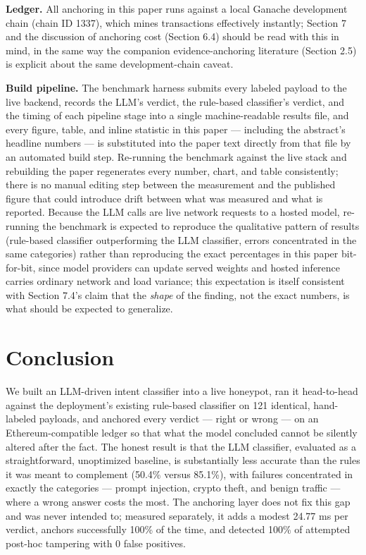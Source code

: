 \documentclass[journal,10pt,twocolumn]{IEEEtran}
\begin{document}
\textbf{Ledger.} All anchoring in this paper runs against a local Ganache development chain (chain ID 1337), which mines transactions effectively instantly; Section 7 and the discussion of anchoring cost (Section 6.4) should be read with this in mind, in the same way the companion evidence-anchoring literature (Section 2.5) is explicit about the same development-chain caveat.

\textbf{Build pipeline.} The benchmark harness submits every labeled payload to the live backend, records the LLM's verdict, the rule-based classifier's verdict, and the timing of each pipeline stage into a single machine-readable results file, and every figure, table, and inline statistic in this paper --- including the abstract's headline numbers --- is substituted into the paper text directly from that file by an automated build step. Re-running the benchmark against the live stack and rebuilding the paper regenerates every number, chart, and table consistently; there is no manual editing step between the measurement and the published figure that could introduce drift between what was measured and what is reported. Because the LLM calls are live network requests to a hosted model, re-running the benchmark is expected to reproduce the qualitative pattern of results (rule-based classifier outperforming the LLM classifier, errors concentrated in the same categories) rather than reproducing the exact percentages in this paper bit-for-bit, since model providers can update served weights and hosted inference carries ordinary network and load variance; this expectation is itself consistent with Section 7.4's claim that the \emph{shape} of the finding, not the exact numbers, is what should be expected to generalize.

\section{Conclusion}

We built an LLM-driven intent classifier into a live honeypot, ran it head-to-head against the deployment's existing rule-based classifier on 121 identical, hand-labeled payloads, and anchored every verdict --- right or wrong --- on an Ethereum-compatible ledger so that what the model concluded cannot be silently altered after the fact. The honest result is that the LLM classifier, evaluated as a straightforward, unoptimized baseline, is substantially less accurate than the rules it was meant to complement (50.4\% versus 85.1\%), with failures concentrated in exactly the categories --- prompt injection, crypto theft, and benign traffic --- where a wrong answer costs the most. The anchoring layer does not fix this gap and was never intended to; measured separately, it adds a modest 24.77 ms per verdict, anchors successfully 100\% of the time, and detected 100\% of attempted post-hoc tampering with 0 false positives.
\end{document}
